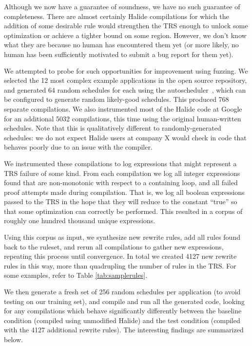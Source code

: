 \documentclass[acmsmall,review]{acmart}\settopmatter{printfolios=true,printccs=false,printacmref=false}
\begin{document}

Although we now have a guarantee of soundness, we have no such guarantee of completeness. There are almost certainly Halide compilations for which the addition of some desirable rule would strengthen the TRS enough to unlock some optimization or achieve a tighter bound on some region. However, we don’t know what they are because no human has encountered them yet (or more likely, no human has been sufficiently motivated to submit a bug report for them yet). 

We attempted to probe for such opportunities for improvement using fuzzing. We selected the 12 most complex example applications in the open source repository, and generated 64 random schedules for each using the autoscheduler~\cite{Adams2019}, which can be configured to generate random likely-good schedules. This produced 768 separate compilations. We also instrumented most of the Halide code at Google for an additional 5032 compilations, this time using the original human-written schedules. Note that this is qualitatively different to randomly-generated schedules: we do not expect Halide users at company X would check in code that behaves poorly due to an issue with the compiler.

We instrumented these compilations to log expressions that might represent a TRS failure of some kind. From each compilation we log all integer expressions found that are non-monotonic with respect to a containing loop, and all failed proof attempts made during compilation. That is, we log all boolean expressions passed to the TRS in the hope that they will reduce to the constant “true” so that some optimization can correctly be performed. This resulted in a corpus of roughly one hundred thousand unique expressions.

Using this corpus as input, we synthesize new rewrite rules, add all rules found back to the ruleset, and rerun all compilations to gather new expressions, repeating this process until convergence. In total we created 4127 new rewrite rules in this way, more than quadrupling the number of rules in the TRS. For some examples, refer to Table \ref{tab:samplerules}.

We then generate a fresh set of 256 random schedules per application (to avoid testing on our training set), and compile and run all the generated code, looking for any compilations which behave significantly differently between the baseline condition (compiled using unmodified Halide) and the test condition (compiled with the 4127 additional rewrite rules). The interesting findings are summarized below.
\end{document}
